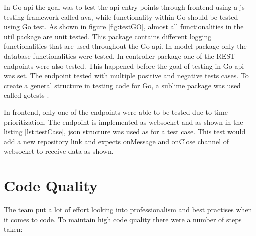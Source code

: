 
In Go \gls{api} the goal was to test the \gls{api} entry points through \gls{frontend} using a \gls{js} testing framework called \gls{ava}, while functionality within Go should be tested using Go test. As shown in figure \ref{fig:testGO}, almost all functionalities in the util package are unit tested. This package contains different logging functionalities that are used throughout the Go \gls{api}. In model package only the database functionalities were tested. In controller package one of the REST endpoints were also tested. This happened before the goal of testing in Go \gls{api} was set. The endpoint tested with multiple positive and negative tests cases. To create a general structure in testing code for Go, a \gls{sublime} package was used called gotests \cite{github:gotestsplugin}.



In \gls{frontend}, only one of the endpoints were able to be tested due to time prioritization. The endpoint is implemented as \gls{websocket} and as shown in the listing \ref{lst:testCase}, \gls{json} structure was used as for a test case. This test would add a new repository link and expects onMessage and onClose channel of \gls{websocket} to receive data as shown.

\section{Code Quality}
The team put a lot of effort looking into professionalism and best practises when it comes to code. To maintain high code quality there were a number of steps taken:

